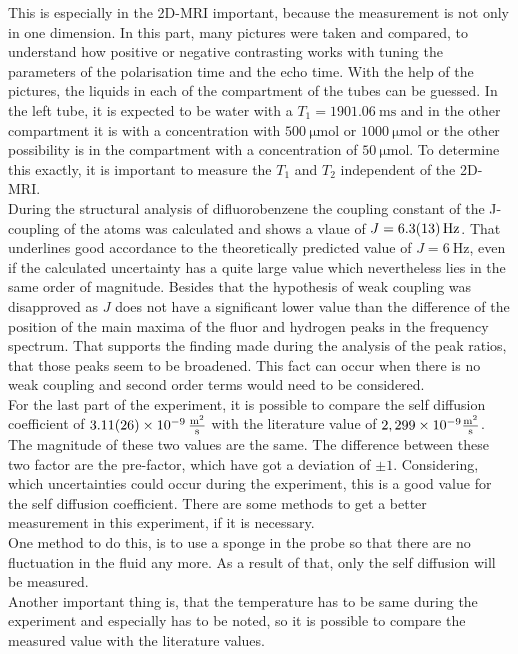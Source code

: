 This is especially in the 2D-MRI important, because the measurement is not only in one dimension. In this part, many pictures were taken and compared, to understand how positive or negative contrasting works with tuning the parameters of the polarisation time and the echo time. With the help of the pictures, the liquids in each of the compartment of the tubes can be guessed. In the left tube, it is expected to be water with a $T_1=\SI{1901,06}{\milli\s}$ and in the other compartment it is  with a concentration with $\SI{500}{\micro\mole}$ or 
$\SI{1000}{\micro\mole}$ or the other possibility is  in the compartment with a concentration of $\SI{50}{\micro\mole}$. To determine this exactly, it is important to measure the $T_1$ and $T_2$ independent of the 2D-MRI.  \\
During the structural analysis of difluorobenzene the coupling constant of the J-coupling of the atoms was calculated and shows a vlaue of $J = \SI{6.3 \pm 1.3}{\hertz}$.
That underlines good accordance to the theoretically predicted value of $J= \SI{6}{\hertz}$, even if the calculated uncertainty has a quite large value which nevertheless lies in the same order of magnitude.
Besides that the hypothesis of weak coupling was disapproved as $J$ does not have a significant lower value than the difference of the position of the main maxima of the fluor and hydrogen peaks in the frequency spectrum.
That supports the finding made during the analysis of the peak ratios, that those peaks seem to be broadened. 
This fact can occur when there is no weak coupling and second order terms would need to be considered.\\
For the last part of the experiment, it is possible to compare the self diffusion coefficient of $\SI{3,11(26)e-9}{\frac{\m^2}{s}}$ with the literature value of $2,299\times  10^{-9}\si{\frac{\m^2}{\s}}$. The magnitude of these two values are the same. The difference between these two factor are the pre-factor, which have got a deviation of $\pm1$. Considering, which uncertainties could occur during the experiment, this is a good value for the self diffusion coefficient. There are some methods to get a better measurement in this experiment, if it is necessary. \\  
One method to do this, is to use a sponge in the probe so that there are no fluctuation in the fluid any more. As a result of that, only the self diffusion will be measured.\\
Another important thing is, that the temperature has to be same during the experiment and especially has to be noted, so it is possible to compare the measured value with the literature values. 